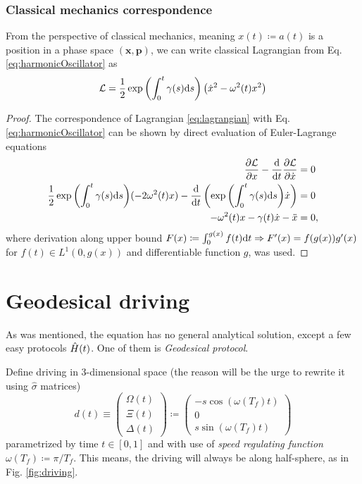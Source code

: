 \subsubsection{Classical mechanics correspondence}
From the perspective of classical mechanics, meaning $x(t)\coloneqq a(t)$ is a position in a phase space $(\bm x,\bm p)$, we can write classical Lagrangian from Eq. \ref{eq:harmonicOscillator} as
\begin{equation}
    \mathcal L=\frac{1}{2}\exp{\left(\int_0^t\gamma(s)\ensuremath{\mathrm{d}}s\right)}\left(\dot x^2-\omega^2(t)x^2\right)
    \label{eq:lagrangian}
\end{equation}
\begin{proof}
    The correspondence of Lagrangian \ref{eq:lagrangian} with Eq. \ref{eq:harmonicOscillator} can be shown by direct evaluation of Euler-Lagrange equations
    \begin{equation}
        \begin{split}
            \frac{\partial \mathcal L}{\partial x}-\frac{\mathrm{d} }{\mathrm{d} t}\frac{\partial \mathcal L}{\partial \dot x}&=0\\
            \frac{1}{2}\exp{\left(\int_0^t\gamma(s)\ensuremath{\mathrm{d}}s\right)}(-2 \omega^2(t)x)-\frac{\mathrm{d} }{\mathrm{d} t}\left(\exp{\left(\int_0^t\gamma(s)\ensuremath{\mathrm{d}}s\right)}\dot x\right) &=0\\
            -\omega^2(t)x-\gamma(t)\dot x-\ddot x&=0,
        \end{split}
    \end{equation}
    where derivation along upper bound $F(x)\coloneqq\int_0^{g(x)}f(t)\mathrm{d} t \Rightarrow F'(x)=f(g(x))g'(x)$ for $f(t)\in L^1(0,g(x))$ and differentiable function $g$, was used.
\end{proof}


\section{Geodesical driving}
As was mentioned, the \Schrodinger equation has no general analytical solution, except a few easy protocols $\hat{H}(t)$. One of them is \emph{Geodesical protocol}. 

Define driving in 3-dimensional space (the reason will be the urge to rewrite it using $\hat\sigma$ matrices)
\begin{equation}
    d(t)\equiv \begin{pmatrix}
        \Omega(t)\\
        \Xi(t)\\
        \Delta(t)
    \end{pmatrix}\coloneqq \begin{pmatrix}
        -s \cos(\omega(T_f)t)\\
        0\\
        s \sin(\omega(T_f)t)
    \end{pmatrix}
\end{equation}
parametrized by time $t\in[0,1]$ and with use of \emph{speed regulating function} $\omega(T_f)\coloneqq \pi/T_f$. This means, the driving will always be along half-sphere, as in Fig. \ref{fig:driving}.

